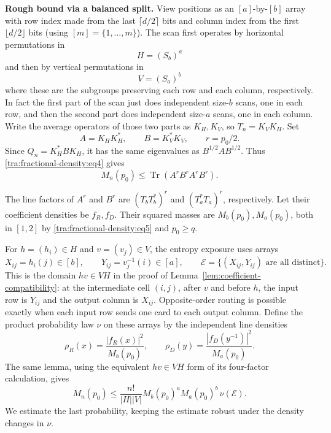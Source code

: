 \label{tra:fractional-density:balanced-operator-split}
\textbf{Rough bound via a balanced split.} View positions as an \([a]\)-by-\([b]\) array with row index made from the last \(\lceil d/2\rceil\) bits and column index from the first \(\lfloor d/2\rfloor\) bits (using \([m]=\{1,\ldots,m\}\)). The scan first operates by horizontal permutations in
\[
 H=(S_b)^a
\]
and then by vertical permutations in
\[
 V=(S_a)^b
\]
where these are the subgroups preserving each row and each column, respectively. In fact the first part of the scan just does independent size-\(b\) scans, one in each row, and then the second part does independent size-\(a\) scans, one in each column. Write the average operators of those two parts as \(K_H,K_V\), so \(T_n=K_V K_H\). Set
\[
 A=K_H K_H^*,\qquad B=K_V^* K_V,\qquad r=p_0/2.
\]
Since \(Q_n=K_H^* B K_H\), it has the same eigenvalues as \(B^{1/2} A B^{1/2}\). Thus \eqref{tra:fractional-density:eq4} gives
\begin{equation}
 M_n(p_0)\le \operatorname{Tr}(A^r B^r A^r B^r).
 \label{tra:fractional-density:eq8}
\end{equation}

\label{tra:fractional-density:coefficient-probability-reduction}
The line factors of $A^r$ and $B^r$ are
$(T_bT_b^*)^r$ and $(T_a^*T_a)^r$, respectively. Let their coefficient
densities be $f_R,f_D$. Their squared masses are $M_b(p_0),M_a(p_0)$,
both in $[1,2]$ by \eqref{tra:fractional-density:eq5} and $p_0\ge q$.

For $h=(h_i)\in H$ and $v=(v_j)\in V$, the entropy exposure uses arrays
\[
 X_{ij}=h_i(j)\in[b],\qquad Y_{ij}=v_j^{-1}(i)\in[a],
 \qquad
 \mathcal E=\{(X_{ij},Y_{ij})\text{ are all distinct}\}.
\]
This is the domain $hv\in VH$ in the proof of
Lemma~\ref{lem:coefficient-compatibility}: at the intermediate cell
$(i,j)$, after $v$ and before $h$, the input row is $Y_{ij}$ and
the output column is $X_{ij}$. Opposite-order routing is possible
exactly when each input row sends one card to each output column.
Define the product probability law $\nu$ on these arrays by the
independent line densities
\[
 \rho_R(x)=\frac{|f_R(x)|^2}{M_b(p_0)},\qquad
 \rho_D(y)=\frac{|f_D(y^{-1})|^2}{M_a(p_0)}.
\]
The same lemma, using the equivalent $hv\in VH$ form of its
four-factor calculation, gives
\begin{equation}
 M_n(p_0)\le\frac{n!}{|H||V|}
      M_b(p_0)^a M_a(p_0)^b\,\nu(\mathcal E).
 \label{tra:fractional-density:eq10}
\end{equation}
We estimate the last probability, keeping the estimate robust under the density changes in \(\nu\).

